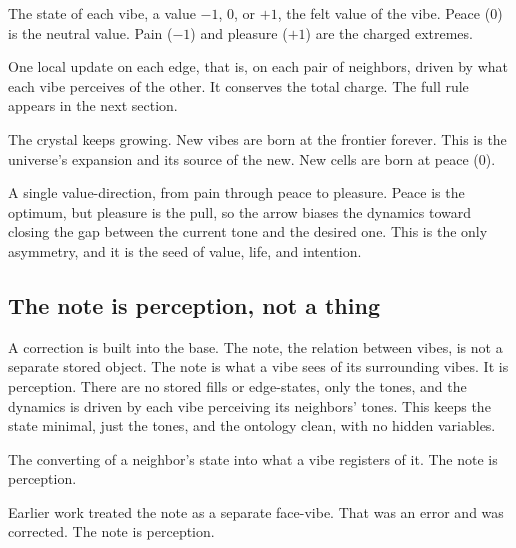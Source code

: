 \begin{definition}
The state of each vibe, a value $-1$, $0$, or $+1$, the felt value of the vibe. Peace ($0$) is the neutral value. Pain ($-1$) and pleasure ($+1$) are the charged extremes.
\end{definition}

\begin{definition}
One local update on each edge, that is, on each pair of neighbors, driven by what each vibe perceives of the other. It conserves the total charge. The full rule appears in the next section.
\end{definition}

\begin{definition}
The crystal keeps growing. New vibes are born at the frontier forever. This is the universe's expansion and its source of the new. New cells are born at peace ($0$).
\end{definition}

\begin{definition}
A single value-direction, from pain through peace to pleasure. Peace is the optimum, but pleasure is the pull, so the arrow biases the dynamics toward closing the gap between the current tone and the desired one. This is the only asymmetry, and it is the seed of value, life, and intention.
\end{definition}

\subsection{The note is perception, not a thing}

A correction is built into the base. The note, the relation between vibes, is not a separate stored object. The note is what a vibe sees of its surrounding vibes. It is perception. There are no stored fills or edge-states, only the tones, and the dynamics is driven by each vibe perceiving its neighbors' tones. This keeps the state minimal, just the tones, and the ontology clean, with no hidden variables.

\begin{definition}[Perception]
The converting of a neighbor's state into what a vibe registers of it. The note is perception.
\end{definition}

Earlier work treated the note as a separate face-vibe. That was an error and was corrected. The note is perception.

